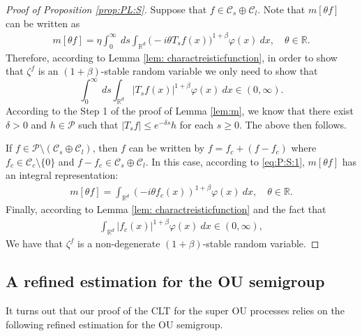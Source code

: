 \documentclass[12pt,a4paper]{amsart}
\theoremstyle{plain}
\theoremstyle{definition}
\numberwithin{equation}{section}
\begin{document}
\begin{proof}[Proof of Proposition \ref{prop:PL:S}]
	Suppose that $f\in \mathcal C_s \oplus \mathcal C_l$.
Note that $m[\theta f]$ can be written as
  \begin{align}
    \label{eq:PL:S:1}
    m[\theta f]
    = \eta \int_0^{\infty}~ds\int_{\mathbb R^d} \big(-i\theta T_s f(x)\big)^{1+\beta} \varphi(x)~dx,
    \quad \theta \in \mathbb R.
  \end{align}
	Therefore, according to Lemma \ref{lem: charactreisticfunction}, in order to show that $\zeta^f$ is an $(1+\beta)$-stable random variable we only need to show that
  \[
    \int_0^{\infty}~ds\int_{\mathbb R^d} | T_{s} f(x)|^{1+\beta} \varphi(x)~dx
    \in (0, \infty).
  \]
  According to the Step 1 of the proof of Lemma \ref{lem:m}, we know that there exist $\delta> 0$ and $h \in \mathcal P$ such that $|T_sf| \leq e^{- \delta s} h$ for each $s\geq 0$.
  The above then follows.

  If $f \in \mathcal P \setminus (\mathcal C_s \oplus \mathcal C_l)$, then $f$ can be written by $f = f_c +(f - f_c)$ where $f_c \in \mathcal C_c\setminus\{0\}$ and $f - f_c \in \mathcal C_s \oplus \mathcal C_l$.
  In this case, according to \eqref{eq:P:S:1}, $m[\theta f]$ has an integral representation:
  \begin{align}
    \label{eq:PL:S:2}
    m[\theta f]
    = \int_{\mathbb R^d} (-i\theta f_c(x))^{1+\beta} \varphi(x) ~dx,
    \quad \theta \in \mathbb R.
  \end{align}
  Finally, according to Lemma \ref{lem: charactreisticfunction} and the fact that
  \begin{align}
    \int_{\mathbb R^d} | f_c(x)|^{1+\beta} \varphi(x)~dx
    \in (0, \infty),
  \end{align}
  We have that $\zeta^f$ is a non-degenerate $(1+\beta)$-stable random variable.
\end{proof}


\subsection{A refined estimation for the OU semigroup}
It turns out that our proof of the CLT for the super OU processes relies on the following refined estimation for the OU semigroup.
\end{document}
